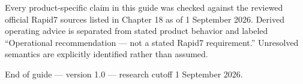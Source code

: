 \documentclass[11pt,letterpaper,oneside]{scrreprt}
\begin{document}
\begin{officialbox}
Every product-specific claim in this guide was checked against the reviewed official Rapid7 sources listed in Chapter 18 as of 1 September 2026. Derived operating advice is separated from stated product behavior and labeled ``Operational recommendation --- not a stated Rapid7 requirement.'' Unresolved semantics are explicitly identified rather than assumed.
\end{officialbox}

\vfill
{\small\color{R7Slate}End of guide --- version 1.0 --- research cutoff 1 September 2026.}
\end{document}
